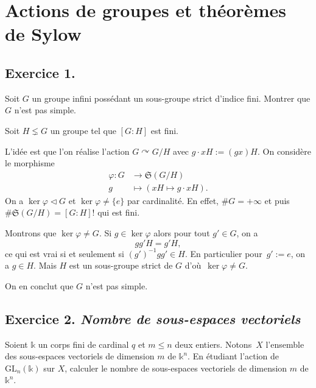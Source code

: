 \documentclass[./main]{subfiles}
\begin{document}
  \chapter{Actions de groupes et théorèmes de Sylow}
  \minitoc

  \section{Exercice 1.}

  \begin{enonce}
    Soit $G$ un groupe infini possédant un sous-groupe strict d'indice fini. Montrer que $G$ n'est pas simple.
  \end{enonce}

  Soit $H \lneq G$ un groupe tel que $[G : H]$ est fini.

  L'idée est que l'on réalise l'action $G \curvearrowright G / H$ avec $g \cdot x H := (gx)H$.
  On considère le morphisme \begin{align*}
    \varphi: G &\longrightarrow \mathfrak{S}(G / H) \\
    g &\longmapsto (xH \mapsto g \cdot xH)
  .\end{align*}
  On a $\ker \varphi \triangleleft G$ et  $\ker \varphi \neq \{e\}$ par cardinalité.
  En effet, $\# G = +\infty$ et puis $\#\mathfrak{S}(G / H) = [G : H]!$ qui est fini.

  Montrons que $\ker \varphi \neq G$.
  Si $g \in \ker\varphi$ alors pour tout  $g' \in G$, on a \[
  g g' H = g' H
  ,\] 
  ce qui est vrai si et seulement si $(g')^{-1} g g' \in H$.
  En particulier pour~$g' := e$, on a $g \in H$.
  Mais $H$ est un sous-groupe strict de $G$ d'où~$\ker \varphi \neq G$.

  On en conclut que $G$ n'est pas simple.

  \section{Exercice 2. \textit{Nombre de sous-espaces vectoriels}}

  \begin{enonce}
    Soient $\mathds{k}$ un corps fini de cardinal $q$ et $m \le n$ deux entiers. Notons~$X$ l'ensemble des sous-espaces vectoriels de dimension $m$ de $\mathds{k}^n$.
    En étudiant l'action de $\mathrm{GL}_n(\mathds{k})$ sur $X$, calculer le nombre de sous-espaces vectoriels de dimension $m$ de $\mathds{k}^n$.
  \end{enonce}
\end{document}
